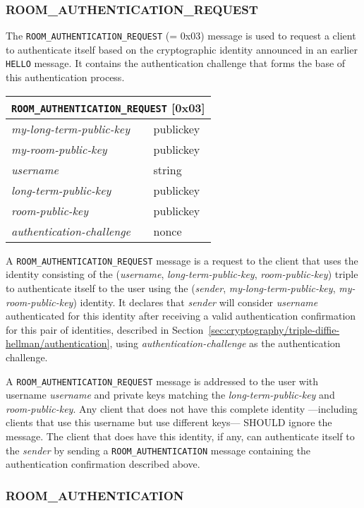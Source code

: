 \documentclass{article}
\def\message#1{\texttt{#1}}
\def\field#1{\textit{#1}}
\def\type#1{\textsf{#1}}
\newenvironment{basicmessage}[2]{
\newcommand{\messagefield}[2]{
\field{##1} & \type{##2} \\
\hline
}
\hspace{2em minus 2em}\begin{tabular}{|l|l|}
\hline
\multicolumn{2}{|c|}{\message{#1} [#2]} \\
\hline
\hline
}{
\end{tabular}
}
\begin{document}
\subsubsection{ROOM\_AUTHENTICATION\_REQUEST}
\label{sec:messages/room-authentication-request}

The \message{ROOM\_AUTHENTICATION\_REQUEST} (= 0x03) message is used to request a client to authenticate itself based on the cryptographic identity announced in an earlier \message{HELLO} message.
It contains the authentication challenge that forms the base of this authentication process.

\begin{basicmessage}{ROOM\_AUTHENTICATION\_REQUEST}{0x03}
\messagefield{my-long-term-public-key}{publickey}
\messagefield{my-room-public-key}{publickey}
\messagefield{username}{string}
\messagefield{long-term-public-key}{publickey}
\messagefield{room-public-key}{publickey}
\messagefield{authentication-challenge}{nonce}
\end{basicmessage}

A \message{ROOM\_AUTHENTICATION\_REQUEST} message is a request to the client that uses the identity consisting of the (\field{username}, \field{long-term-public-key}, \field{room-public-key}) triple to authenticate itself to the user using the (\field{sender}, \field{my-long-term-public-key}, \field{my-room-public-key}) identity.
It declares that \field{sender} will consider \field{username} authenticated for this identity after receiving a valid authentication confirmation for this pair of identities, described in Section~\ref{sec:cryptography/triple-diffie-hellman/authentication}, using \field{authentication-challenge} as the authentication challenge.

A \message{ROOM\_AUTHENTICATION\_REQUEST} message is addressed to the user with username \field{username} and private keys matching the \field{long-term-public-key} and \field{room-public-key}.
Any client that does not have this complete identity ---including clients that use this username but use different keys--- SHOULD ignore the message.
The client that does have this identity, if any, can authenticate itself to the \field{sender} by sending a \message{ROOM\_AUTHENTICATION} message containing the authentication confirmation described above.


\subsubsection{ROOM\_AUTHENTICATION}
\label{sec:messages/room-authentication}
\end{document}
